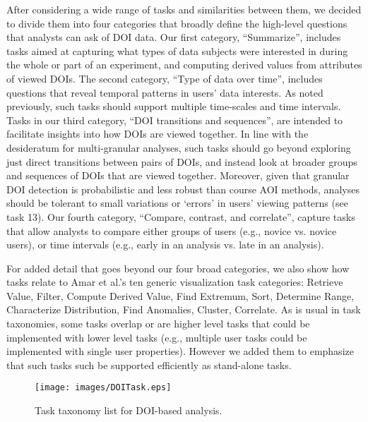 After considering a wide range of tasks and similarities between them, we decided to divide them into four categories that broadly define the high-level questions that analysts can ask of DOI data. Our first category, ``Summarize'', includes tasks aimed at capturing what types of data subjects were interested in during the whole or part of an experiment, and computing derived values from attributes of viewed DOIs.  The second category, ``Type of data over time'', includes questions that reveal temporal patterns in users' data interests. As noted previously, such tasks should support multiple time-scales and time intervals. Tasks in our third category, ``DOI transitions and sequences'', are intended to facilitate insights into how DOIs are viewed together. In line with the desideratum for multi-granular analyses, such tasks should go beyond exploring just direct transitions between pairs of DOIs, and instead look at broader groups and sequences of DOIs that are viewed together. Moreover, given that granular DOI detection is probabilistic and less robust than course AOI methods, analyses should be tolerant to small variations or `errors' in users' viewing patterns (see task 13). Our fourth category, ``Compare, contrast, and correlate'', capture tasks that allow analysts to compare either groups of users (e.g., novice vs. novice users), or time intervals (e.g., early in an analysis vs. late in an analysis). 
 
For added detail that goes beyond our four broad categories, we also show how tasks relate to Amar et al.'s ten generic visualization task categories: Retrieve Value, Filter, Compute Derived Value, Find Extremum, Sort, Determine Range, Characterize Distribution, Find Anomalies, Cluster, Correlate. As is usual in task taxonomies, some tasks overlap or are higher level tasks that could be implemented with lower level tasks (e.g., multiple user tasks could be implemented with single user properties). However we added them to emphasize that such tasks such be supported efficiently as stand-alone tasks. 

\begin{figure*}[!htb]
  \centering
  \texttt{[image: images/DOITask.eps]}
  \caption{Task taxonomy list for DOI-based analysis. }
	\label{fig:taxonomy}
\end{figure*}
